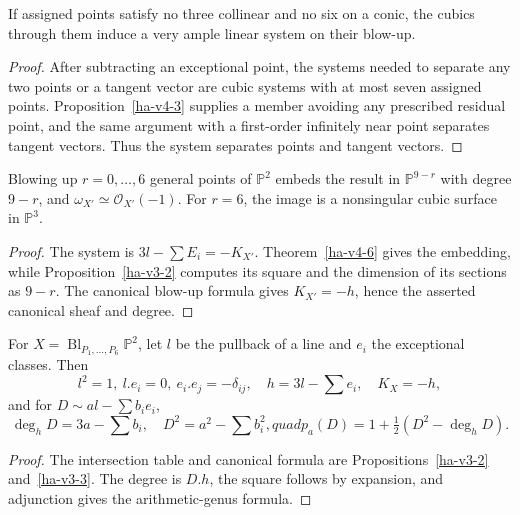 \begin{theorem}
\label{ha-v4-6}
If assigned points satisfy no three collinear and no six on a conic, the cubics
through them induce a very ample linear system on their blow-up.
\end{theorem}
\begin{proof}
After subtracting an exceptional point, the systems needed to separate any two
points or a tangent vector are cubic systems with at most seven assigned points.
Proposition~\ref{ha-v4-3} supplies a member avoiding any prescribed residual
point, and the same argument with a first-order infinitely near point separates
tangent vectors.  Thus the system separates points and tangent vectors.
\end{proof}

\begin{corollary}
\label{ha-v4-7}
Blowing up \(r=0,\ldots,6\) general points of \(\mathbb P^2\) embeds the result
in \(\mathbb P^{9-r}\) with degree \(9-r\), and
\(\omega_{X'}\simeq\mathcal O_{X'}(-1)\).  For \(r=6\), the image is a
nonsingular cubic surface in \(\mathbb P^3\).
\end{corollary}
\begin{proof}
The system is \(3l-\sum E_i=-K_{X'}\).  Theorem~\ref{ha-v4-6} gives the
embedding, while Proposition~\ref{ha-v3-2} computes its square and the
dimension of its sections as \(9-r\).  The canonical blow-up formula gives
\(K_{X'}=-h\), hence the asserted canonical sheaf and degree.
\end{proof}

\begin{proposition}
\label{ha-v4-8}
For \(X=\operatorname{Bl}_{P_1,\ldots,P_6}\mathbb P^2\), let \(l\) be the pullback
of a line and \(e_i\) the exceptional classes.  Then
\[
 l^2=1,\ l.e_i=0,\ e_i.e_j=-\delta_{ij},\quad
 h=3l-\sum e_i,\quad K_X=-h,
\]
and for \(D\sim al-\sum b_ie_i\),
\[
 \deg_hD=3a-\sum b_i,\quad D^2=a^2-\sum b_i^2,quad
 p_a(D)=1+\tfrac12(D^2-\deg_hD).
\]
\end{proposition}
\begin{proof}
The intersection table and canonical formula are Propositions~\ref{ha-v3-2}
and~\ref{ha-v3-3}.  The degree is \(D.h\), the square follows by expansion,
and adjunction gives the arithmetic-genus formula.
\end{proof}

